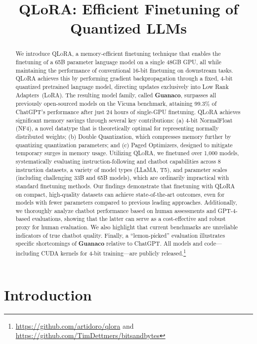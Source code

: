 \title{QLoRA: Efficient Finetuning of Quantized LLMs}

\begin{abstract}
We introduce \textsc{QLoRA}, a memory-efficient finetuning technique that enables the finetuning of a 65B parameter language model on a single 48GB GPU, all while maintaining the performance of conventional 16-bit finetuning on downstream tasks. \textsc{QLoRA} achieves this by performing gradient backpropagation through a fixed, 4-bit quantized pretrained language model, directing updates exclusively into Low Rank Adapters~(LoRA). The resulting model family, called \textbf{Guanaco}, surpasses all previously open-sourced models on the Vicuna benchmark, attaining 99.3\% of ChatGPT’s performance after just 24 hours of single-GPU finetuning. \textsc{QLoRA} achieves significant memory savings through several key contributions: (a) 4-bit NormalFloat (NF4), a novel datatype that is theoretically optimal for representing normally distributed weights; (b) Double Quantization, which compresses memory further by quantizing quantization parameters; and (c) Paged Optimizers, designed to mitigate temporary surges in memory usage. Utilizing \textsc{QLoRA}, we finetuned over 1,000 models, systematically evaluating instruction-following and chatbot capabilities across 8 instruction datasets, a variety of model types (LLaMA, T5), and parameter scales (including challenging 33B and 65B models), which are ordinarily impractical with standard finetuning methods. Our findings demonstrate that finetuning with QLoRA on compact, high-quality datasets can achieve state-of-the-art outcomes, even for models with fewer parameters compared to previous leading approaches. Additionally, we thoroughly analyze chatbot performance based on human assessments and GPT-4-based evaluations, showing that the latter can serve as a cost-effective and robust proxy for human evaluation. We also highlight that current benchmarks are unreliable indicators of true chatbot quality. Finally, a “lemon-picked” evaluation illustrates specific shortcomings of \textbf{Guanaco} relative to ChatGPT. All models and code—including CUDA kernels for 4-bit training—are publicly released.\footnote{\url{https://github.com/artidoro/qlora} and \url{https://github.com/TimDettmers/bitsandbytes}}
\end{abstract}

\section{Introduction}

